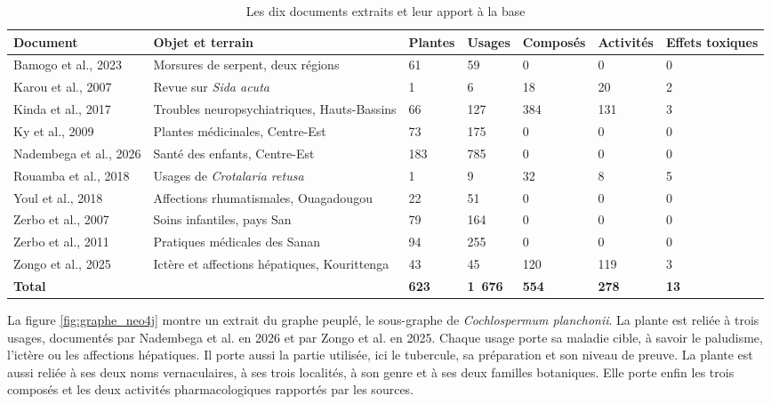\begin{table}[H]
\centering
\caption{Les dix documents extraits et leur apport à la base}
\label{tab:dix_sources}
\small
\begin{tabular}{|L{2.3cm}|L{3.9cm}|C{1.3cm}|C{1.2cm}|C{1.8cm}|C{1.5cm}|C{1.5cm}|}
\hline
\textbf{Document} & \textbf{Objet et terrain} & \textbf{Plantes} & \textbf{Usages} & \textbf{Composés} & \textbf{Activités} & \textbf{Effets toxiques} \\
\hline
Bamogo et al., 2023 \cite{bamogo_cross-sectional_2023} & Morsures de serpent, deux régions & 61 & 59 & 0 & 0 & 0 \\
\hline
Karou et al., 2007 \cite{simplice_sida_2007} & Revue sur \textit{Sida acuta} & 1 & 6 & 18 & 20 & 2 \\
\hline
Kinda et al., 2017 \cite{kinda_medicinal_2017} & Troubles neuropsychiatriques, Hauts-Bassins & 66 & 127 & 384 & 131 & 3 \\
\hline
Ky et al., 2009 \cite{ky_medicinal_2009} & Plantes médicinales, Centre-Est & 73 & 175 & 0 & 0 & 0 \\
\hline
Nadembega et al., 2026 \cite{pascal_nadembega_ethnobotanical_2026} & Santé des enfants, Centre-Est & 183 & 785 & 0 & 0 & 0 \\
\hline
Rouamba et al., 2018 \cite{rouamba_ethno-medicinal_2018} & Usages de \textit{Crotalaria retusa} & 1 & 9 & 32 & 8 & 5 \\
\hline
Youl et al., 2018 \cite{estelle_ethnopharmacological_2018} & Affections rhumatismales, Ouagadougou & 22 & 51 & 0 & 0 & 0 \\
\hline
Zerbo et al., 2007 \cite{zerbo_contribution_2008} & Soins infantiles, pays San & 79 & 164 & 0 & 0 & 0 \\
\hline
Zerbo et al., 2011 \cite{zerbo_plantes_2011} & Pratiques médicales des Sanan & 94 & 255 & 0 & 0 & 0 \\
\hline
Zongo et al., 2025 \cite{zongo2025} & Ictère et affections hépatiques, Kourittenga & 43 & 45 & 120 & 119 & 3 \\
\hline
\textbf{Total} & & \textbf{623} & \textbf{1~676} & \textbf{554} & \textbf{278} & \textbf{13} \\
\hline
\end{tabular}
\end{table}

La figure \ref{fig:graphe_neo4j} montre un extrait du graphe peuplé, le sous-graphe de \textit{Cochlospermum planchonii}. La plante est reliée à trois usages, documentés par Nadembega et al. en 2026 et par Zongo et al. en 2025. Chaque usage porte sa maladie cible, à savoir le paludisme, l'ictère ou les affections hépatiques. Il porte aussi la partie utilisée, ici le tubercule, sa préparation et son niveau de preuve. La plante est aussi reliée à ses deux noms vernaculaires, à ses trois localités, à son genre et à ses deux familles botaniques. Elle porte enfin les trois composés et les deux activités pharmacologiques rapportés par les sources.

